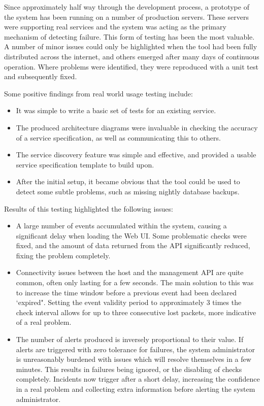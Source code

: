 \documentclass{cshonours}
\begin{document}
Since approximately half way through the development process, a prototype of the system has been running on a number of production servers. These servers were supporting real services and the system was acting as the primary mechanism of detecting failure. This form of testing has been the most valuable. A number of minor issues could only be highlighted when the tool had been fully distributed across the internet, and others emerged after many days of continuous operation. Where problems were identified, they were reproduced with a unit test and subsequently fixed.

Some positive findings from real world usage testing include:

\begin{itemize}
  \item It was simple to write a basic set of tests for an existing service.
  \item The produced architecture diagrams were invaluable in checking the accuracy of a service specification, as well as communicating this to others.
  \item The service discovery feature was simple and effective, and provided a usable service specification template to build upon.
  \item After the initial setup, it became obvious that the tool could be used to detect some subtle problems, such as missing nightly database backups.
\end{itemize}

Results of this testing highlighted the following issues:

\begin{itemize}
  \item A large number of events accumulated within the system, causing a significant delay when loading the Web UI. Some problematic checks were fixed, and the amount of data returned from the API significantly reduced, fixing the problem completely.
  \item Connectivity issues between the host and the management API are quite common, often only lasting for a few seconds. The main solution to this was to increase the time window before a previous event had been declared `expired". Setting the event validity period to approximately 3 times the check interval allows for up to three consecutive lost packets, more indicative of a real problem.
  \item The number of alerts produced is inversely proportional to their value. If alerts are triggered with zero tolerance for failures, the system administrator is unreasonably burdened with issues which will resolve themselves in a few minutes. This results in failures being ignored, or the disabling of checks completely. Incidents now trigger after a short delay, increasing the confidence in a real problem and collecting extra information before alerting the system administrator.
\end{itemize}
\end{document}
